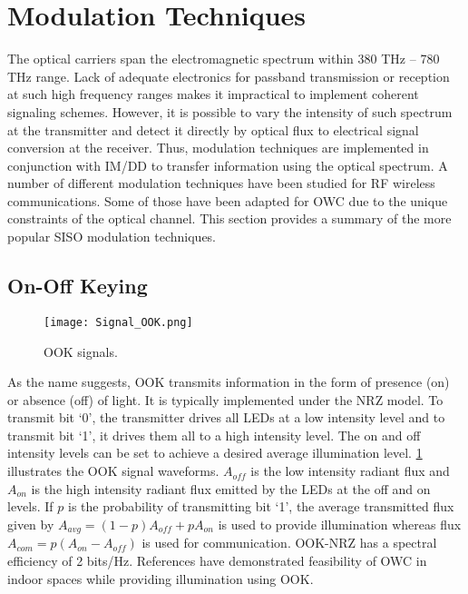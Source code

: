\section{Modulation Techniques}
\label{sec:sisoModulation}
\graphicspath{{_SISO/Figures/}}

The optical carriers span the electromagnetic spectrum within 380 THz -- 780 THz range. Lack of adequate electronics for passband transmission or reception at such high frequency ranges makes it impractical to implement coherent signaling schemes. However, it is possible to vary the intensity of such spectrum at the transmitter and detect it directly by optical flux to electrical signal conversion at the receiver. Thus, modulation techniques are implemented in conjunction with IM/DD to transfer information using the optical spectrum. A number of different modulation techniques have been studied for RF wireless communications. Some of those have been adapted for OWC due to the unique constraints of the optical channel. This section provides a summary of the more popular SISO modulation techniques.

\subsection{On-Off Keying}
\label{subsec:sisoModulationOOK}
\begin{figure}[t]
	\centering
		\texttt{[image: Signal\_OOK.png]}
		\caption{OOK signals.}
		\label{fig:sisoSigOOK}
\end{figure}
As the name suggests, OOK transmits information in the form of presence (on) or absence (off) of light. It is typically implemented under the NRZ model. To transmit bit `0', the transmitter drives all LEDs at a low intensity level and to transmit bit `1', it drives them all to a high intensity level. The on and off intensity levels can be set to achieve a desired average illumination level. \figurename{ \ref{fig:sisoSigOOK}} illustrates the OOK signal waveforms. $A_{off}$ is the low intensity radiant flux and $A_{on}$ is the high intensity radiant flux emitted by the LEDs at the off and on levels. If $p$ is the probability of transmitting bit `1', the average transmitted flux given by $A_{avg} = (1-p)A_{off} + pA_{on}$ is used to provide illumination whereas flux $A_{com} = p(A_{on}-A_{off})$ is used for communication. OOK-NRZ has a spectral efficiency of 2 bits/Hz. References \cite{kom04a,vuc09b} have demonstrated feasibility of OWC in indoor spaces while providing illumination using OOK.


